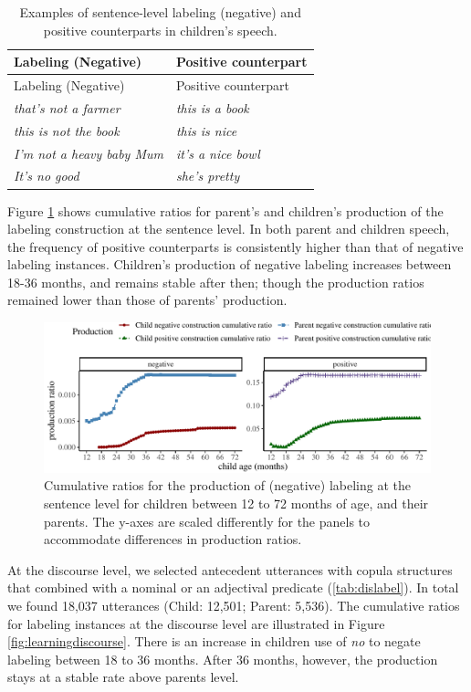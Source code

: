 \documentclass[
  english,
  man,floatsintext]{apa6}
\begin{document}
\begin{longtable}[]{@{}ll@{}}
\caption{\label{tab:label} Examples of sentence-level labeling (negative) and positive counterparts in children's speech.}\tabularnewline
\toprule
Labeling (Negative) & Positive counterpart \\
\midrule
\endfirsthead
\toprule
Labeling (Negative) & Positive counterpart \\
\midrule
\endhead
\emph{that's not a farmer} & \emph{this is a book} \\
\emph{this is not the book} & \emph{this is nice} \\
\emph{I'm not a heavy baby Mum} & \emph{it's a nice bowl} \\
\emph{It's no good} & \emph{she's pretty} \\
\bottomrule
\end{longtable}

Figure \ref{fig:learning} shows cumulative ratios for parent's and children's production of the labeling construction at the sentence level. In both parent and children speech, the frequency of positive counterparts is consistently higher than that of negative labeling instances. Children's production of negative labeling increases between 18-36 months, and remains stable after then; though the production ratios remained lower than those of parents' production.

\begin{figure}[H]

{\centering \includegraphics{neg_construction_article_files/figure-latex/learning-1} 

}

\caption{Cumulative ratios for the production of (negative) labeling at the sentence level for children between 12 to 72 months of age, and their parents. The y-axes are scaled differently for the panels to accommodate differences in production ratios.}\label{fig:learning}
\end{figure}

At the discourse level, we selected antecedent utterances with copula structures that combined with a nominal or an adjectival predicate (\ref{tab:dislabel}). In total we found 18,037 utterances (Child: 12,501; Parent: 5,536). The cumulative ratios for labeling instances at the discourse level are illustrated in Figure \ref{fig:learningdiscourse}. There is an increase in children use of \emph{no} to negate labeling between 18 to 36 months. After 36 months, however, the production stays at a stable rate above parents level.
\end{document}
